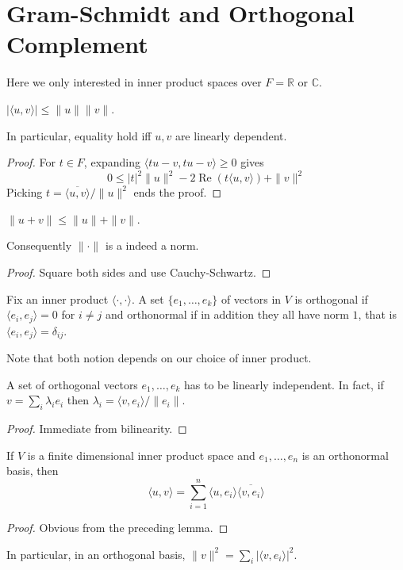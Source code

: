 \section{Gram-Schmidt and Orthogonal Complement}
Here we only interested in inner product spaces over $F=\mathbb R$ or $\mathbb C$.
\begin{lemma}
    $|\langle u,v\rangle|\le\|u\|\|v\|$.
\end{lemma}
In particular, equality hold iff $u,v$ are linearly dependent.
\begin{proof}
    For $t\in F$, expanding $\langle tu-v,tu-v\rangle \ge 0$ gives
    $$0\le|t|^2\|u\|^2-2\operatorname{Re}(t\langle u,v\rangle)+\|v\|^2$$
    Picking $t=\overline{\langle u,v\rangle}/\|u\|^2$ ends the proof.
\end{proof}
\begin{corollary}
    $\|u+v\|\le \|u\|+\|v\|$.
\end{corollary}
Consequently $\|\cdot\|$ is a indeed a norm.
\begin{proof}
    Square both sides and use Cauchy-Schwartz.
\end{proof}
\begin{definition}
    Fix an inner product $\langle\cdot,\cdot\rangle$.
    A set $\{e_1,\ldots,e_k\}$ of vectors in $V$ is orthogonal if $\langle e_i,e_j\rangle=0$ for $i\neq j$ and orthonormal if in addition they all have norm $1$, that is $\langle e_i,e_j\rangle=\delta_{ij}$.
\end{definition}
Note that both notion depends on our choice of inner product.
\begin{lemma}
    A set of orthogonal vectors $e_1,\ldots,e_k$ has to be linearly independent.
    In fact, if $v=\sum_i\lambda_ie_i$ then $\lambda_i=\langle v,e_i\rangle/\|e_i\|$.
\end{lemma}
\begin{proof}
    Immediate from bilinearity.
\end{proof}
\begin{lemma}
    If $V$ is a finite dimensional inner product space and $e_1,\ldots,e_n$ is an orthonormal basis, then
    $$\langle u,v\rangle=\sum_{i=1}^n\langle u,e_i\rangle\overline{\langle v,e_i\rangle}$$
\end{lemma}
\begin{proof}
    Obvious from the preceding lemma.
\end{proof}
In particular, in an orthogonal basis, $\|v\|^2=\sum_i|\langle v,e_i\rangle|^2$.
